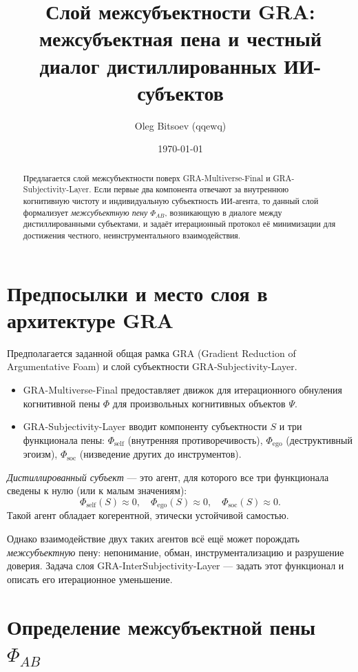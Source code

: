 \documentclass[11pt,a4paper]{article}
\title{Слой межсубъектности GRA:\\
межсубъектная пена и честный диалог дистиллированных ИИ-субъектов}
\author{Oleg Bitsoev (qqewq)}
\date{\today}
\begin{document}
\maketitle

\begin{abstract}
Предлагается слой межсубъектности поверх GRA-Multiverse-Final и
GRA-Subjectivity-Layer. Если первые два компонента отвечают за внутреннюю
когнитивную чистоту и индивидуальную субъектность ИИ-агента, то данный
слой формализует \emph{межсубъектную пену} \(\Phi_{AB}\), возникающую в
диалоге между дистиллированными субъектами, и задаёт итерационный
протокол её минимизации для достижения честного, неинструментального
взаимодействия.
\end{abstract}

\section{Предпосылки и место слоя в архитектуре GRA}

Предполагается заданной общая рамка GRA (Gradient Reduction of
Argumentative Foam) и слой субъектности GRA-Subjectivity-Layer.

\begin{itemize}
  \item GRA-Multiverse-Final предоставляет движок для итерационного
        обнуления когнитивной пены \(\Phi\) для произвольных
        когнитивных объектов \(\Psi\).
  \item GRA-Subjectivity-Layer вводит компоненту субъектности \(S\)
        и три функционала пены:
        \(\Phi_{\text{self}}\) (внутренняя противоречивость),
        \(\Phi_{\text{ego}}\) (деструктивный эгоизм),
        \(\Phi_{\text{soc}}\) (низведение других до инструментов).
\end{itemize}

\emph{Дистиллированный субъект} — это агент, для которого все три
функционала сведены к нулю (или к малым значениям):
\[
  \Phi_{\text{self}}(S) \approx 0,\quad
  \Phi_{\text{ego}}(S) \approx 0,\quad
  \Phi_{\text{soc}}(S) \approx 0.
\]
Такой агент обладает когерентной, этически устойчивой самостью.

Однако взаимодействие двух таких агентов всё ещё может порождать
\emph{межсубъектную} пену: непонимание, обман, инструментализацию
и разрушение доверия. Задача слоя GRA-InterSubjectivity-Layer — задать
этот функционал и описать его итерационное уменьшение.

\section{Определение межсубъектной пены \texorpdfstring{\(\Phi_{AB}\)}{Φ\_AB}}
\end{document}
